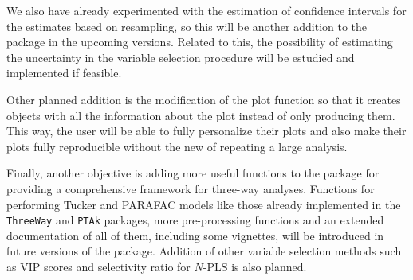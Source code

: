 We also have already experimented with the estimation of confidence intervals for the estimates based on resampling, so this will be another addition to the package in the upcoming versions. Related to this, the possibility of estimating the uncertainty in the variable selection procedure will be estudied and implemented if feasible.

Other planned addition is the modification of the plot function so that it creates objects with all the information about the plot instead of only producing them. This way, the user will be able to fully personalize their plots and also make their plots fully reproducible without the new of repeating a large analysis.

Finally, another objective is adding more useful functions to the package for providing a comprehensive framework for three-way analyses. Functions for performing Tucker and PARAFAC models like those already implemented in the \texttt{ThreeWay} and \texttt{PTAk} packages, more pre-processing functions and an extended documentation of all of them, including some vignettes, will be introduced in future versions of the package. Addition of other variable selection methods such as VIP scores and selectivity ratio for $N$-PLS is also planned. 
